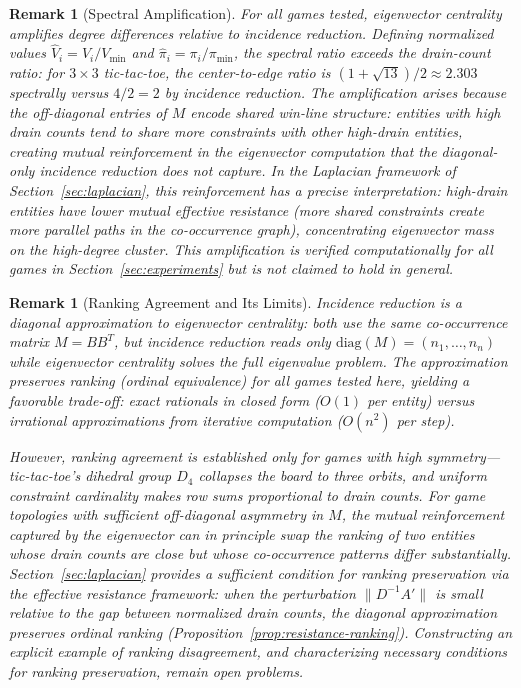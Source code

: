 \documentclass[11pt,a4paper]{article}
\newtheorem{remark}[theorem]{Remark}
\begin{document}
\begin{remark}[Spectral Amplification]\label{rem:amplification}
For all games tested, eigenvector centrality amplifies degree differences relative to incidence reduction.
Defining normalized values $\hat{V}_i = V_i / V_{\min}$ and $\hat{\pi}_i = \pi_i / \pi_{\min}$, the spectral ratio exceeds the drain-count ratio:
for $3 \times 3$ tic-tac-toe, the center-to-edge ratio is $(1 + \sqrt{13})/2 \approx 2.303$ spectrally versus $4/2 = 2$ by incidence reduction.
The amplification arises because the off-diagonal entries of $M$ encode shared win-line structure: entities with high drain counts tend to share more constraints with other high-drain entities, creating mutual reinforcement in the eigenvector computation that the diagonal-only incidence reduction does not capture.
In the Laplacian framework of Section~\ref{sec:laplacian}, this reinforcement has a precise interpretation: high-drain entities have lower mutual effective resistance (more shared constraints create more parallel paths in the co-occurrence graph), concentrating eigenvector mass on the high-degree cluster.
This amplification is verified computationally for all games in Section~\ref{sec:experiments} but is not claimed to hold in general.
\end{remark}

\begin{remark}[Ranking Agreement and Its Limits]\label{rem:ranking-limits}
Incidence reduction is a \emph{diagonal approximation} to eigenvector centrality: both use the same co-occurrence matrix $M = BB^T$, but incidence reduction reads only $\mathrm{diag}(M) = (n_1, \ldots, n_n)$ while eigenvector centrality solves the full eigenvalue problem.
The approximation preserves ranking (ordinal equivalence) for all games tested here, yielding a favorable trade-off: exact rationals in closed form ($O(1)$ per entity) versus irrational approximations from iterative computation ($O(n^2)$ per step).

However, ranking agreement is established only for games with high symmetry---tic-tac-toe's dihedral group $D_4$ collapses the board to three orbits, and uniform constraint cardinality makes row sums proportional to drain counts.
For game topologies with sufficient off-diagonal asymmetry in $M$, the mutual reinforcement captured by the eigenvector can in principle swap the ranking of two entities whose drain counts are close but whose co-occurrence patterns differ substantially.
Section~\ref{sec:laplacian} provides a \emph{sufficient} condition for ranking preservation via the effective resistance framework: when the perturbation $\|D^{-1}A'\|$ is small relative to the gap between normalized drain counts, the diagonal approximation preserves ordinal ranking (Proposition~\ref{prop:resistance-ranking}).
Constructing an explicit example of ranking disagreement, and characterizing \emph{necessary} conditions for ranking preservation, remain open problems.
\end{remark}
\end{document}

